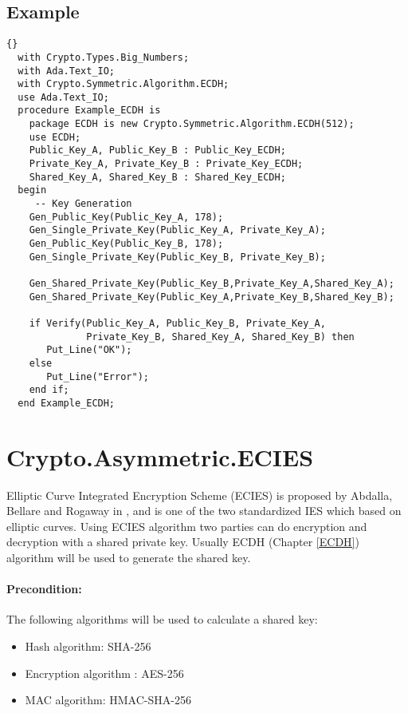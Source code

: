 \section{Example}
\begin{lstlisting}{}
  with Crypto.Types.Big_Numbers;
  with Ada.Text_IO;
  with Crypto.Symmetric.Algorithm.ECDH;
  use Ada.Text_IO;
  procedure Example_ECDH is
    package ECDH is new Crypto.Symmetric.Algorithm.ECDH(512);
    use ECDH;
    Public_Key_A, Public_Key_B : Public_Key_ECDH;
    Private_Key_A, Private_Key_B : Private_Key_ECDH;
    Shared_Key_A, Shared_Key_B : Shared_Key_ECDH;
  begin
     -- Key Generation
    Gen_Public_Key(Public_Key_A, 178);
    Gen_Single_Private_Key(Public_Key_A, Private_Key_A);
    Gen_Public_Key(Public_Key_B, 178);
    Gen_Single_Private_Key(Public_Key_B, Private_Key_B);

    Gen_Shared_Private_Key(Public_Key_B,Private_Key_A,Shared_Key_A);
    Gen_Shared_Private_Key(Public_Key_A,Private_Key_B,Shared_Key_B);
    
    if Verify(Public_Key_A, Public_Key_B, Private_Key_A, 
              Private_Key_B, Shared_Key_A, Shared_Key_B) then
       Put_Line("OK");
    else 
       Put_Line("Error");
    end if;
  end Example_ECDH;
\end{lstlisting}

\chapter{Crypto.Asymmetric.ECIES}
Elliptic Curve Integrated Encryption Scheme (ECIES) is proposed by
Abdalla, Bellare and Rogaway in \cite{DBLP:conf/ctrsa/AbdallaBR01},
and is one of the two standardized IES which based on elliptic
curves. Using ECIES algorithm two parties can do encryption and
decryption with a shared private key. Usually ECDH (Chapter
\ref{ECDH}) algorithm will be used to generate the shared key.

\subsubsection*{Precondition:}
The following algorithms will be used to calculate a shared key:
\begin{itemize}
\item Hash algorithm\quad\quad : SHA-256
\item Encryption algorithm : AES-256
\item MAC algorithm\quad\quad : HMAC-SHA-256
\end{itemize}
